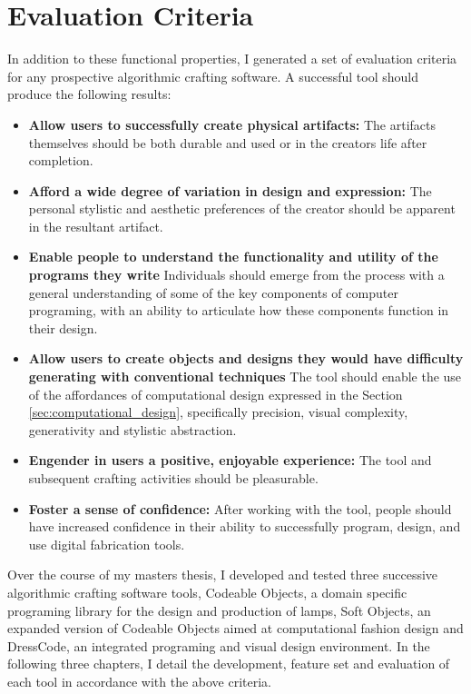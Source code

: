 \section{Evaluation Criteria}
In addition to these functional properties, I generated a set of evaluation criteria for any prospective algorithmic crafting software. A successful tool should produce the following results:
\begin{itemize}

\item \textbf{Allow users to successfully create physical artifacts:} The artifacts themselves should be both durable and used or in the creators life after completion.
\item \textbf{Afford a wide degree of variation in design and expression:} The personal stylistic and aesthetic preferences of the creator should be apparent in the resultant artifact.
\item \textbf{Enable people to understand the functionality and utility of the programs they write} Individuals should emerge from the process with a general understanding of some of the key components of computer programing, with an ability to articulate how these components function in their design. 
\item \textbf{Allow users to create objects and designs they would have difficulty generating with conventional techniques} The tool should enable the use of the affordances of computational design expressed in the Section \ref{sec:computational_design}, specifically precision, visual complexity, generativity and stylistic abstraction.
\item \textbf{Engender in users a positive, enjoyable experience:} The tool and subsequent crafting activities should be pleasurable.
\item \textbf{Foster a sense of confidence:} After working with the tool, people should have increased confidence in their ability to successfully program, design, and use digital fabrication tools. 
\end{itemize}

Over the course of my masters thesis, I developed and tested three successive algorithmic crafting software tools, Codeable Objects, a domain specific programing library for the design and production of lamps, Soft Objects, an expanded version of Codeable Objects aimed at computational fashion design and DressCode, an integrated programing and visual design environment. In the following  three chapters, I detail the development, feature set and evaluation of each tool in accordance with the above criteria. 